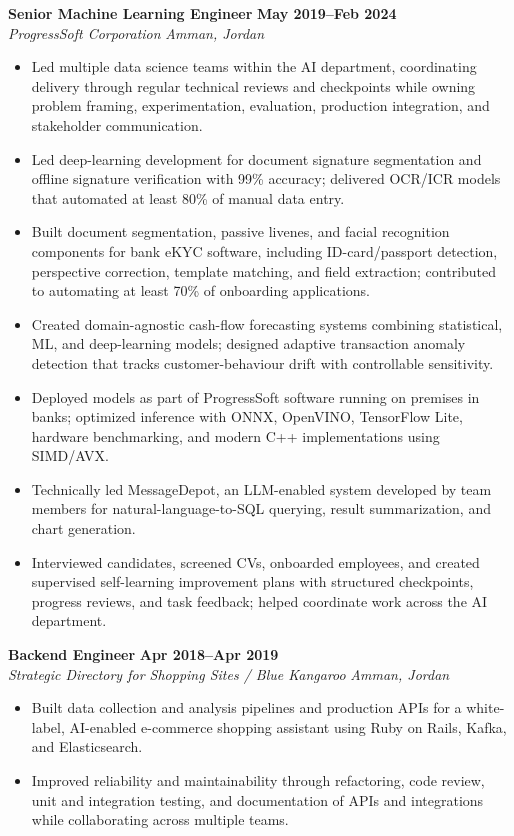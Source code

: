 \documentclass[10pt,a4paper]{article}
\newcommand{\role}[4]{%
  \textbf{#1} \hfill \textbf{#2}\\[-1pt]
  \textit{#3} \hfill \textit{#4}\par\vspace{-2pt}
}
\begin{document}
\role{Senior Machine Learning Engineer}{May 2019--Feb 2024}{ProgressSoft Corporation}{Amman, Jordan}
\begin{itemize}
  \item Led multiple data science teams within the AI department, coordinating delivery through regular technical reviews and checkpoints while owning problem framing, experimentation, evaluation, production integration, and stakeholder communication.
  \item Led deep-learning development for document signature segmentation and offline signature verification with 99\% accuracy; delivered OCR/ICR models that automated at least 80\% of manual data entry.
  \item Built document segmentation, passive livenes, and facial recognition components for bank eKYC software, including ID-card/passport detection, perspective correction, template matching, and field extraction; contributed to automating at least 70\% of onboarding applications.
  \item Created domain-agnostic cash-flow forecasting systems combining statistical, ML, and deep-learning models; designed adaptive transaction anomaly detection that tracks customer-behaviour drift with controllable sensitivity.
  \item Deployed models as part of ProgressSoft software running on premises in banks; optimized inference with ONNX, OpenVINO, TensorFlow Lite, hardware benchmarking, and modern C++ implementations using SIMD/AVX.
  \item Technically led MessageDepot, an LLM-enabled system developed by team members for natural-language-to-SQL querying, result summarization, and chart generation.
  \item Interviewed candidates, screened CVs, onboarded employees, and created supervised self-learning improvement plans with structured checkpoints, progress reviews, and task feedback; helped coordinate work across the AI department.
\end{itemize}

\role{Backend Engineer}{Apr 2018--Apr 2019}{Strategic Directory for Shopping Sites / Blue Kangaroo}{Amman, Jordan}
\begin{itemize}
  \item Built data collection and analysis pipelines and production APIs for a white-label, AI-enabled e-commerce shopping assistant using Ruby on Rails, Kafka, and Elasticsearch.
  \item Improved reliability and maintainability through refactoring, code review, unit and integration testing, and documentation of APIs and integrations while collaborating across multiple teams.
\end{itemize}
\end{document}
